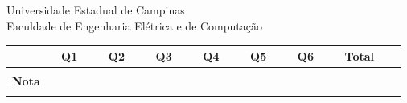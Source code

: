 \documentclass{article}
\begin{document}
\thispagestyle{empty}
\begin{tcolorbox}[colframe=black,colback=gray!20,arc=0pt]
\begin{center}
{\sc\Large Universidade Estadual de Campinas} \vspace{0.5cm} \\
{\sc \large Faculdade de Engenharia Elétrica e de Computação}
\end{center}
\end{tcolorbox}



\noindent
\hrulefill
{}
\hspace{-2.4mm}
\hrulefill
{}
\hspace{-2.4mm}
\hrulefill

\vspace{1cm}

\noindent
	\hfill

\vspace{1cm}

\begin{center}
    \begin{tabular}{|c||c|c|c|c|c|c|c|c|}
      \hline
                 & $\phantom{m}${\bf Q1}$\phantom{m}$ & $\phantom{m}${\bf Q2}$\phantom{m}$ & $\phantom{m}${\bf Q3}$\phantom{m}$ & $\phantom{m}${\bf Q4}$\phantom{m}$ & $\phantom{m}${\bf Q5}$\phantom{m}$ & $\phantom{m}${\bf Q6}$\phantom{m}$ & $\phantom{m}${\bf Total}$\phantom{m}$ \\
      \hline
                 &          &          &          &          &                &&                 \\
      {\bf Nota} &          &          &          &          &                  &&               \\
                 &          &          &          &          &                    &&             \\
      \hline
    \end{tabular}
\end{center}
\end{document}
